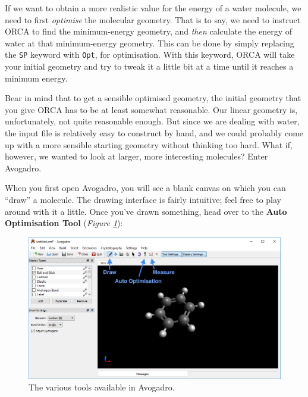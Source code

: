 \documentclass[10pt]{article}
\newcommand{\figref}[1]{\textit{Figure \ref{fig:#1}}}
\begin{document}
If we want to obtain a more realistic value for the energy of a water molecule, we need to first \textit{optimise} the molecular geometry. That is to say, we need to instruct ORCA to find the minimum-energy geometry, and \textit{then} calculate the energy of water at that minimum-energy geometry. This can be done by simply replacing the \texttt{SP} keyword with \texttt{Opt}, for optimisation. With this keyword, ORCA will take your initial geometry and try to tweak it a little bit at a time until it reaches a minimum energy.

Bear in mind that to get a sensible optimised geometry, the initial geometry that you give ORCA has to be at least somewhat reasonable. Our linear geometry is, unfortunately, not quite reasonable enough. But since we are dealing with water, the input file is relatively easy to construct by hand, and we could probably come up with a more sensible starting geometry without thinking too hard. What if, however, we wanted to look at larger, more interesting molecules? Enter Avogadro. 

When you first open Avogadro, you will see a blank canvas on which you can ``draw'' a molecule. The drawing interface is fairly intuitive; feel free to play around with it a little. Once you've drawn something, head over to the \textbf{Auto Optimisation Tool} (\figref{avoopt}):

\begin{figure}[H]
    \centering
    \includegraphics[scale=0.45]{./img/avoopt}
    \caption{The various tools available in Avogadro.}
    \label{fig:avoopt}
\end{figure} 
\end{document}

